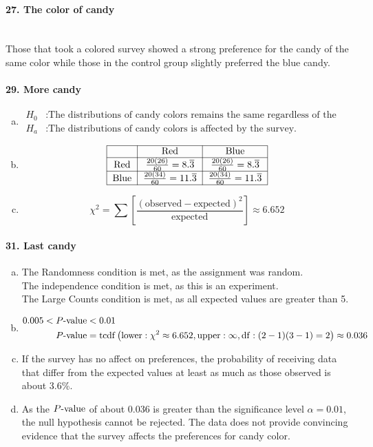 \documentclass[../Homework]{subfiles}
\begin{document}
		\paragraph{27. The color of candy}\ \\
			Those that took a colored survey showed a strong preference for the candy of the same color while those in the control group slightly preferred the blue candy.
		\paragraph{29. More candy}
			\begin{enumerate}[a.]
				\item		
					\begin{align*}
						H_0&: \text{The distributions of candy colors remains the same regardless of the survey.} \\
						H_a&: \text{The distributions of candy colors is affected by the survey.}
					\end{align*}
				\item
					\[\begin{tabular}{|c|c|c|}\hline
						& Red & Blue \\\hline
						Red & $\frac{20(26)}{60} = 8.\overline{3}$ & $\frac{20(26)}{60} = 8.\overline{3}$ \\\hline
						Blue & $\frac{20(34)}{60} = 11.\overline{3}$ & $\frac{20(34)}{60} = 11.\overline{3}$ \\\hline
					\end{tabular}\]
				\item
					\[\chi^2 = \sum\left[\mathrm{\frac{(observed - expected)^2}{expected}}\right] \approx 6.652\]
			\end{enumerate}			
		\paragraph{31. Last candy}
			\begin{enumerate}[a.]
				\item
					The Randomness condition is met, as the assignment was random. \\
					The independence condition is met, as this is an experiment. \\
					The Large Counts condition is met, as all expected values are greater than 5.
				\item
					\begin{align*}
						0.005 < P\text{-value} &< 0.01 \\
						P\text{-value} &= \operatorname{tcdf}\left(\operatorname{lower}: \chi^2 \approx 6.652, \operatorname{upper}: \infty, \operatorname{df}: (2 - 1)(3 - 1) = 2\right) \approx 0.036
					\end{align*}
				\item
					If the survey has no affect on preferences, the probability of receiving data that differ from the expected values at least as much as those observed is about 3.6\%.
				\item
					As the $P\text{-value}$ of about 0.036 is greater than the significance level $\alpha = 0.01$, the null hypothesis cannot be rejected. The data does not provide convincing evidence that the survey affects the preferences for candy color.
			\end{enumerate}
\end{document}
